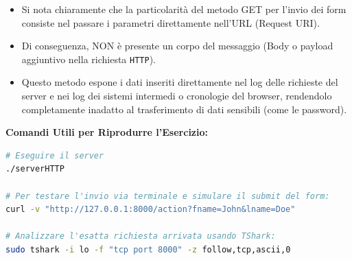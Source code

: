 \documentclass[11pt]{article}
\begin{document}
\begin{tcolorbox}[colback=green!5!white,colframe=green!75!black,title=\textbf{RISPOSTA}, breakable]
\begin{itemize}
    \item Si nota chiaramente che la particolarità del metodo GET per l'invio dei form consiste nel passare i parametri direttamente nell'URL (Request URI).
    \item Di conseguenza, NON è presente un corpo del messaggio (Body o payload aggiuntivo nella richiesta \texttt{HTTP}).
    \item Questo metodo espone i dati inseriti direttamente nel log delle richieste del server e nei log dei sistemi intermedi o cronologie del browser, rendendolo completamente inadatto al trasferimento di dati sensibili (come le password).
\end{itemize}

\textbf{Comandi Utili per Riprodurre l'Esercizio:}
\begin{lstlisting}[language=bash, basicstyle=\ttfamily\small]
# Eseguire il server
./serverHTTP

# Per testare l'invio via terminale e simulare il submit del form:
curl -v "http://127.0.0.1:8000/action?fname=John&lname=Doe"

# Analizzare l'esatta richiesta arrivata usando TShark:
sudo tshark -i lo -f "tcp port 8000" -z follow,tcp,ascii,0
\end{lstlisting}
\end{tcolorbox}
\end{document}
